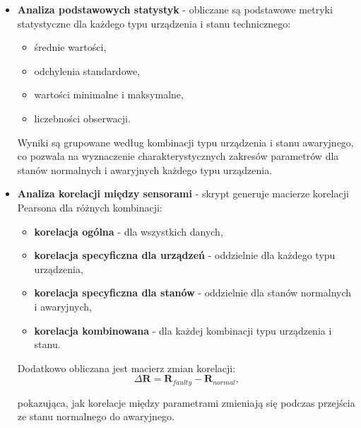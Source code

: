 \begin{itemize}
    \setlength\itemsep{0.5em}

    \item \textbf{Analiza podstawowych statystyk} - obliczane są podstawowe metryki statystyczne dla każdego typu urządzenia i stanu technicznego:

\vspace{0.3em}

\begin{itemize}
    \item średnie wartości,
    \item odchylenia standardowe,
    \item wartości minimalne i maksymalne,
    \item liczebności obserwacji.
\end{itemize}

\vspace{0.3em}

Wyniki są grupowane według kombinacji typu urządzenia i stanu awaryjnego, co pozwala na wyznaczenie charakterystycznych zakresów parametrów dla stanów normalnych i awaryjnych każdego typu urządzenia.

    \item \textbf{Analiza korelacji między sensorami} - skrypt generuje macierze korelacji Pearsona \cite{pearson_correlation} dla różnych kombinacji:
    
\begin{itemize}
    \item \textbf{korelacja ogólna} - dla wszystkich danych,
    \item \textbf{korelacja specyficzna dla urządzeń} - oddzielnie dla każdego typu urządzenia,
    \item \textbf{korelacja specyficzna dla stanów} - oddzielnie dla stanów normalnych i awaryjnych,
    \item \textbf{korelacja kombinowana} - dla każdej kombinacji typu urządzenia i stanu.
\end{itemize}

\vspace{0.3em}

Dodatkowo obliczana jest macierz zmian korelacji:
\begin{equation}
\Delta\mathbf{R} = \mathbf{R}_{faulty} - \mathbf{R}_{normal},
\end{equation}

pokazująca, jak korelacje między parametrami zmieniają się podczas przejścia ze stanu normalnego do awaryjnego.


\end{itemize}
